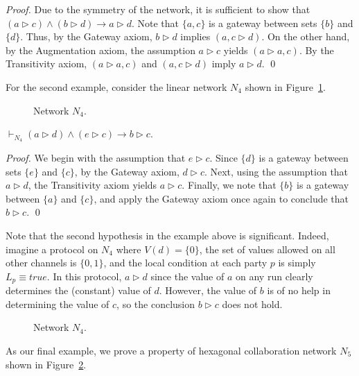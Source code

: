 \documentclass{llncs}
\newcommand{\gateway}{Gateway }
\begin{document}
\begin{proof}
Due to the symmetry of the network, it is sufficient to show that $(a\rhd c) \wedge (b\rhd d) \rightarrow a\rhd d$.
Note that $\{a,c\}$ is a gateway between sets $\{b\}$ and $\{d\}$. Thus, by the \gateway axiom,
$b\rhd d$ implies $(a,c\rhd d)$. On the other hand, by the Augmentation axiom, the assumption $a\rhd c$ yields $(a\rhd a, c)$. 
By the Transitivity axiom,  $(a \rhd a,c)$ and $(a,c \rhd d)$ imply $a\rhd d$. \qed
\end{proof}
For the second example, consider the linear network $N_4$ shown in Figure~\ref{linear_graph_5edges}.
\begin{figure}[htbp]
   \centering
   \caption{Network $N_4$.}
   \label{linear_graph_5edges}
\end{figure}


\begin{proposition}\label{linear example theorem}
$\vdash_{N_4} (a\rhd d) \wedge (e\rhd c) \rightarrow b\rhd c$.
\end{proposition}

\begin{proof}
We begin with the assumption that $e\rhd c$.  Since $\{d\}$ is a gateway between sets $\{e\}$ and $\{c\}$, by the \gateway axiom, $d\rhd c$.  Next, using the assumption that $a \rhd d$, the Transitivity axiom yields $a \rhd c$.  Finally, we note that $\{b\}$ is a gateway between $\{a\}$ and $\{c\}$, and apply the \gateway axiom once again to conclude that $b \rhd c$.
\qed \end{proof}

Note that the second hypothesis in the example above is significant.  Indeed, imagine a protocol on $N_4$ where $V(d) = \{0\}$, the set of values allowed on all other channels is $\{0,1\}$, and the local condition at each party $p$ is simply $L_p \equiv true$.  In this protocol, $a \rhd d$ since the value of $a$ on any run clearly determines the (constant) value of $d$.   However, the value of $b$ is of no help in determining the value of $c$, so the conclusion $b \rhd c$ does not hold.

\begin{figure}[htbp]
\begin{center}
\caption{Network $N_4$.}
\label{benzene_graph}
\end{center}
\end{figure}
As our final example, we prove a property of hexagonal collaboration network $N_5$ shown in Figure~\ref{benzene_graph}.
\end{document}
